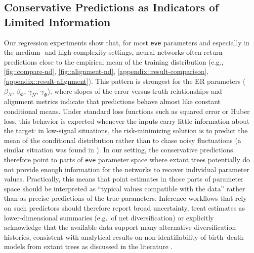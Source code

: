 {\subsection{Conservative Predictions as Indicators of Limited Information}
\label{ch3::sec::discussion::conservative-regression}
Our regression experiments show that, for most \texttt{eve} parameters and especially in the medium- and high-complexity settings, neural networks often return predictions close to the empirical mean of the training distribution (e.g., \autoref{fig::compare-nd}, \autoref{fig::alignment-nd}, \autoref{appendix::result-comparison}, \autoref{appendix::result-alignment}). This pattern is strongest for the ER parameters ($\beta_N$, $\beta_{\varPhi}$, $\gamma_N$, $\gamma_{\varPhi}$), where slopes of the error-versus-truth relationships and alignment metrics indicate that predictions behave almost like constant conditional means. Under standard loss functions such as squared error or Huber loss, this behavior is expected whenever the inputs carry little information about the target: in low-signal situations, the risk-minimizing solution is to predict the mean of the conditional distribution rather than to chase noisy fluctuations (a similar situation was found in \citet{qin_parameter_2025}). In our setting, the conservative predictions therefore point to parts of \texttt{eve} parameter space where extant trees potentially do not provide enough information for the networks to recover individual parameter values. Practically, this means that point estimates in those parts of parameter space should be interpreted as “typical values compatible with the data” rather than as precise predictions of the true parameters. Inference workflows that rely on such predictors should therefore report broad uncertainty, treat estimates as lower-dimensional summaries (e.g.\ of net diversification) or explicitly acknowledge that the available data support many alternative diversification histories, consistent with analytical results on non-identifiability of birth--death models from extant trees as discussed in the literature \citep{louca_extant_2020, pannetier_branching_2021}.

}
